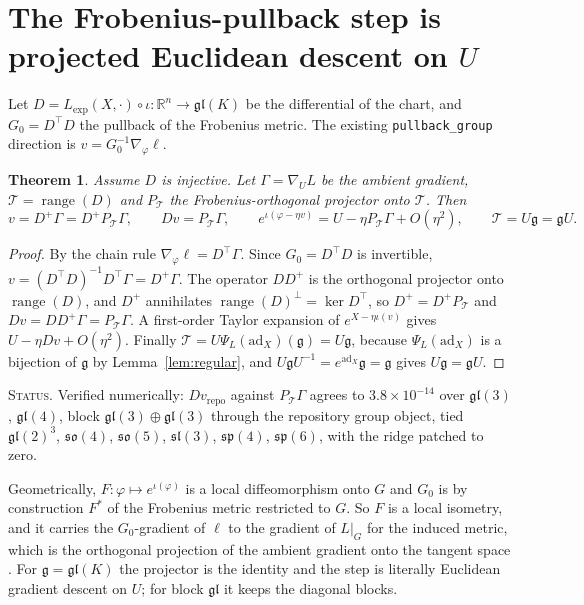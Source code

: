 \documentclass[11pt]{article}
\newtheorem{theorem}{Theorem}[section]
\theoremstyle{definition}
\theoremstyle{remark}
\newcommand{\R}{\mathbb{R}}
\newcommand{\g}{\mathfrak{g}}
\newcommand{\gl}{\mathfrak{gl}}
\newcommand{\ad}{\mathrm{ad}}
\newcommand{\range}{\operatorname{range}}
\newcommand{\status}[1]{\par\smallskip\noindent\textsc{Status.} #1\par\smallskip}
\begin{document}
\section{The Frobenius-pullback step is projected Euclidean descent on \texorpdfstring{$U$}{U}}\label{sec:pullback}

Let $D=L_{\exp}(X,\cdot)\circ\iota:\R^n\to\gl(K)$ be the differential of the chart, and $G_0=D^\top D$ the pullback of the Frobenius metric. The existing \texttt{pullback\_group} direction is $v=G_0^{-1}\nabla_\varphi\ell$.

\begin{theorem}\label{thm:projected}
Assume $D$ is injective. Let $\Gamma=\nabla_UL$ be the ambient gradient, $\mathcal{T}=\range(D)$ and $P_\mathcal{T}$ the Frobenius-orthogonal projector onto $\mathcal{T}$. Then
\begin{equation}\label{eq:projected}
v=D^+\Gamma=D^+P_\mathcal{T}\Gamma,\qquad Dv=P_\mathcal{T}\Gamma,\qquad e^{\iota(\varphi-\eta v)}=U-\eta P_\mathcal{T}\Gamma+O(\eta^2),\qquad \mathcal{T}=U\g=\g U.
\end{equation}
\end{theorem}
\begin{proof}
By the chain rule $\nabla_\varphi\ell=D^\top\Gamma$. Since $G_0=D^\top D$ is invertible, $v=(D^\top D)^{-1}D^\top\Gamma=D^+\Gamma$. The operator $DD^+$ is the orthogonal projector onto $\range(D)$, and $D^+$ annihilates $\range(D)^\perp=\ker D^\top$, so $D^+=D^+P_\mathcal{T}$ and $Dv=DD^+\Gamma=P_\mathcal{T}\Gamma$. A first-order Taylor expansion of $e^{X-\eta\iota(v)}$ gives $U-\eta Dv+O(\eta^2)$. Finally $\mathcal{T}=U\Psi_L(\ad_X)(\g)=U\g$, because $\Psi_L(\ad_X)$ is a bijection of $\g$ by Lemma~\ref{lem:regular}, and $U\g U^{-1}=e^{\ad_X}\g=\g$ gives $U\g=\g U$.
\end{proof}
\status{Verified numerically: $D v_{\mathrm{repo}}$ against $P_\mathcal{T}\Gamma$ agrees to $3.8\times10^{-14}$ over $\gl(3)$, $\gl(4)$, block $\gl(3)\oplus\gl(3)$ through the repository group object, tied $\gl(2)^{3}$, $\mathfrak{so}(4)$, $\mathfrak{so}(5)$, $\mathfrak{sl}(3)$, $\mathfrak{sp}(4)$, $\mathfrak{sp}(6)$, with the ridge patched to zero.}

Geometrically, $F:\varphi\mapsto e^{\iota(\varphi)}$ is a local diffeomorphism onto $G$ and $G_0$ is by construction $F^*$ of the Frobenius metric restricted to $G$. So $F$ is a local isometry, and it carries the $G_0$-gradient of $\ell$ to the gradient of $L|_G$ for the induced metric, which is the orthogonal projection of the ambient gradient onto the tangent space \cite[Sec.~3.6.1]{Absil2008}. For $\g=\gl(K)$ the projector is the identity and the step is literally Euclidean gradient descent on $U$; for block $\gl$ it keeps the diagonal blocks.
\end{document}
